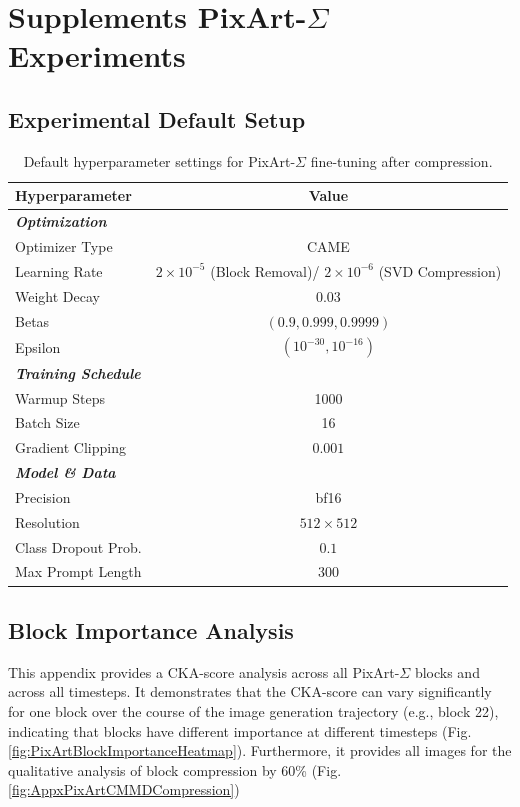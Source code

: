 \chapter{Supplements PixArt-$\Sigma$ Experiments}

\section{Experimental Default Setup}
\begin{table}[H]
	\centering
	\caption[PixArt-$\Sigma$ Fine-Funing Hyperparameters]{Default hyperparameter settings for PixArt-$\Sigma$ fine-tuning after compression.}
	\label{tab:hyperparameterTraining}
	\begin{tabular}{l c}
		\toprule
		\textbf{Hyperparameter} & \textbf{Value} \\
		\midrule
		\multicolumn{2}{l}{\textit{\textbf{Optimization}}} \\
		\midrule
		Optimizer Type & CAME \\
		Learning Rate & $2 \times 10^{-5}$ (Block Removal)/ $2 \times 10^{-6}$ (SVD Compression)\\
		Weight Decay & $0.03$ \\
		Betas & $(0.9, 0.999, 0.9999)$ \\
		Epsilon & $(10^{-30}, 10^{-16})$ \\
		\midrule
		\multicolumn{2}{l}{\textit{\textbf{Training Schedule}}} \\
		\midrule
		Warmup Steps & 1000 \\
		Batch Size & 16 \\
		Gradient Clipping & $0.001$ \\
		\midrule
		\multicolumn{2}{l}{\textit{\textbf{Model \& Data}}} \\
		\midrule
		Precision & bf16 \\
		Resolution & $512 \times 512$ \\
		Class Dropout Prob. & $0.1$ \\
		Max Prompt Length & 300 \\
		\bottomrule
	\end{tabular}
\end{table}

\section{Block Importance Analysis}
This appendix provides a \gls{CKA}-score analysis across all PixArt-$\Sigma$ blocks and across all timesteps. It demonstrates that the \gls{CKA}-score can vary significantly for one block over the course of the image generation trajectory (e.g., block 22), indicating that blocks have different importance at different timesteps (Fig. \ref{fig:PixArtBlockImportanceHeatmap}). Furthermore, it provides all images for the qualitative analysis of block compression by 60\% (Fig. \ref{fig:AppxPixArtCMMDCompression})

